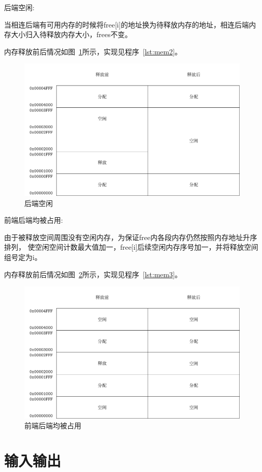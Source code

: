 
\newpage
后端空闲:

当相连后端有可用内存的时候将free[i]的地址换为待释放内存的地址，相连后端内存大小归入待释放内存大小，frees不变。

内存释放前后情况如图~\ref{fig:mem2}所示，实现见程序~\ref{lst:mem2}。

\begin{figure}[h]
  \centering
  \includegraphics[width=.7\textwidth]{fig/mem2.pdf}
  \caption{后端空闲}
  \label{fig:mem2}
\end{figure}


前端后端均被占用:

由于被释放空间周围没有空闲内存，为保证free内各段内存仍然按照内存地址升序排列，
使空闲空间计数最大值加一，free[i]后续空闲内存序号加一，并将释放空间组号定为i。

内存释放前后情况如图~\ref{fig:mem3}所示，实现见程序~\ref{lst:mem3}。
\begin{figure}[h]
  \centering
  \includegraphics[width=.7\textwidth]{fig/mem3.pdf}
  \caption{前端后端均被占用}
  \label{fig:mem3}
\end{figure}

\section{输入输出}

